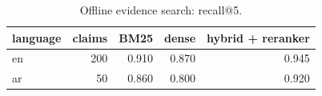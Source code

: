 \begin{table}[t]
\centering
\caption{Offline evidence search: recall@5.}
\label{tab:tab_retrieval}
\begin{tabular}{lrrrr}
\toprule
language & claims & BM25 & dense & hybrid + reranker \\
\midrule
en & 200 & 0.910 & 0.870 & 0.945 \\
ar & 50 & 0.860 & 0.800 & 0.920 \\
\bottomrule
\end{tabular}
\end{table}

